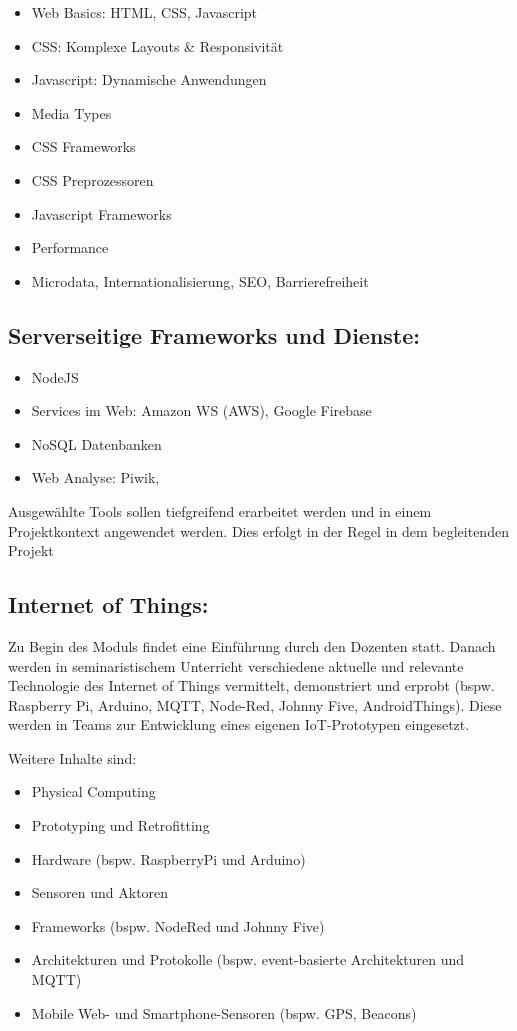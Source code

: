 \begin{itemize}
\tightlist
\item
  Web Basics: HTML, CSS, Javascript
\item
  CSS: Komplexe Layouts \& Responsivität
\item
  Javascript: Dynamische Anwendungen
\item
  Media Types
\item
  CSS Frameworks
\item
  CSS Preprozessoren
\item
  Javascript Frameworks
\item
  Performance
\item
  Microdata, Internationalisierung, SEO, Barrierefreiheit
\end{itemize}

\subsection{Serverseitige Frameworks und
Dienste:}\label{serverseitige-frameworks-und-dienste-1}

\begin{itemize}
\tightlist
\item
  NodeJS
\item
  Services im Web: Amazon WS (AWS), Google Firebase
\item
  NoSQL Datenbanken
\item
  Web Analyse: Piwik,
\end{itemize}

Ausgewählte Tools sollen tiefgreifend erarbeitet werden und in einem
Projektkontext angewendet werden. Dies erfolgt in der Regel in dem
begleitenden Projekt

\subsection{Internet of Things:}\label{internet-of-things-1}

Zu Begin des Moduls findet eine Einführung durch den Dozenten statt.
Danach werden in seminaristischem Unterricht verschiedene aktuelle und
relevante Technologie des Internet of Things vermittelt, demonstriert
und erprobt (bspw. Raspberry Pi, Arduino, MQTT, Node-Red, Johnny Five,
AndroidThings). Diese werden in Teams zur Entwicklung eines eigenen
IoT-Prototypen eingesetzt.

Weitere Inhalte sind:

\begin{itemize}
\tightlist
\item
  Physical Computing
\item
  Prototyping und Retrofitting
\item
  Hardware (bspw. RaspberryPi und Arduino)
\item
  Sensoren und Aktoren
\item
  Frameworks (bspw. NodeRed und Johnny Five)
\item
  Architekturen und Protokolle (bspw. event-basierte Architekturen und
  MQTT)
\item
  Mobile Web- und Smartphone-Sensoren (bspw. GPS, Beacons)
\end{itemize}

